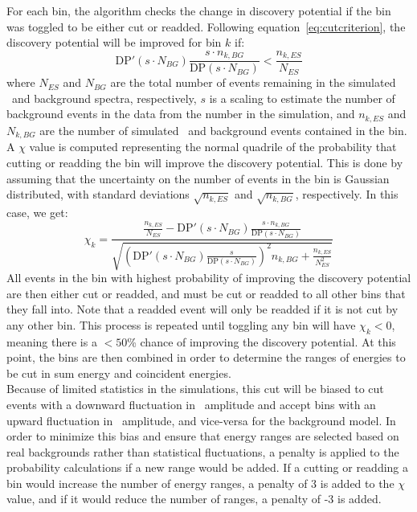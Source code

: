 \documentclass[/main.tex]{subfiles}
\begin{document}
For each bin, the algorithm checks the change in discovery potential if the bin was toggled to be either cut or readded.
Following equation~\ref{eq:cutcriterion}, the discovery potential will be improved for bin $k$ if:
\begin{equation}
  \mathrm{DP}'(s\cdot N_{BG})\frac{s\cdot n_{k,BG}}{\mathrm{DP}(s\cdot N_{BG})} < \frac{n_{k,ES}}{N_{ES}}
\end{equation}
where $N_{ES}$ and $N_{BG}$ are the total number of events remaining in the simulated \bbes\ and background spectra, respectively, $s$ is a scaling to estimate the number of background events in the data from the number in the simulation, and $n_{k,ES}$ and $N_{k,BG}$ are the number of simulated \bbes\ and background events contained in the bin.
A $\chi$ value is computed representing the normal quadrile of the probability that cutting or readding the bin will improve the discovery potential.
This is done by assuming that the uncertainty on the number of events in the bin is Gaussian distributed, with standard deviations $\sqrt{n_{k,ES}}$ and $\sqrt{n_{k,BG}}$, respectively.
In this case, we get:
\begin{equation}
  \chi_k = \frac{ \frac{n_{k,ES}}{N_{ES}} - \mathrm{DP}'(s\cdot N_{BG})\frac{s\cdot n_{k,BG}}{\mathrm{DP}(s\cdot N_{BG})} }{ \sqrt{ (\mathrm{DP}'(s\cdot N_{BG})\frac{s}{\mathrm{DP}(s\cdot N_{BG})})^2n_{k,BG} + \frac{n_{k,ES}}{N_{ES}^2} } }
\end{equation}
All events in the bin with highest probability of improving the discovery potential are then either cut or readded, and must be cut or readded to all other bins that they fall into.
Note that a readded event will only be readded if it is not cut by any other bin.
This process is repeated until toggling any bin will have $\chi_k<0$, meaning there is a $<50$\% chance of improving the discovery potential.
At this point, the bins are then combined in order to determine the ranges of energies to be cut in sum energy and coincident energies.
\\
Because of limited statistics in the simulations, this cut will be biased to cut events with a downward fluctuation in \bbes\ amplitude and accept bins with an upward fluctuation in \bbes\ amplitude, and vice-versa for the background model.
In order to minimize this bias and ensure that energy ranges are selected based on real backgrounds rather than statistical fluctuations, a penalty is applied to the probability calculations if a new range would be added.
If a cutting or readding a bin would increase the number of energy ranges, a penalty of 3 is added to the $\chi$ value, and if it would reduce the number of ranges, a penalty of -3 is added.
\end{document}
